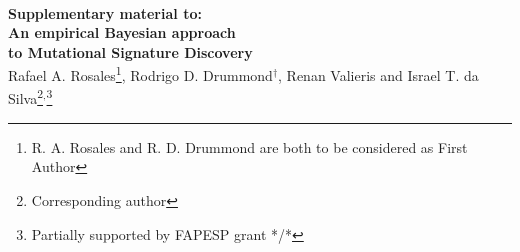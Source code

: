 \documentclass[11pt]{amsart}
\theoremstyle{definition}
\theoremstyle{remark}
\begin{document}
\title[R. A. Rosales, R. D. Drummond, R. Valieris, I. T. da Silva]{}
\\[1em]
 \begin{center}
   {\Large\bf Supplementary material to:\\[0.4em]
   An empirical Bayesian approach\\[0.3em] 
   to Mutational Signature Discovery\\[2em]}
   {\large 
     Rafael A. Rosales\footnote{R. A. Rosales and R. D. Drummond are
       both to be considered as First Author}, 
     Rodrigo D. Drummond$^\dagger$,
     Renan Valieris and 
     Israel T. da Silva\footnote{Corresponding author}$^,$\footnote{Partially supported by FAPESP grant */*}}
 \end{center}


\maketitle

\end{document}
